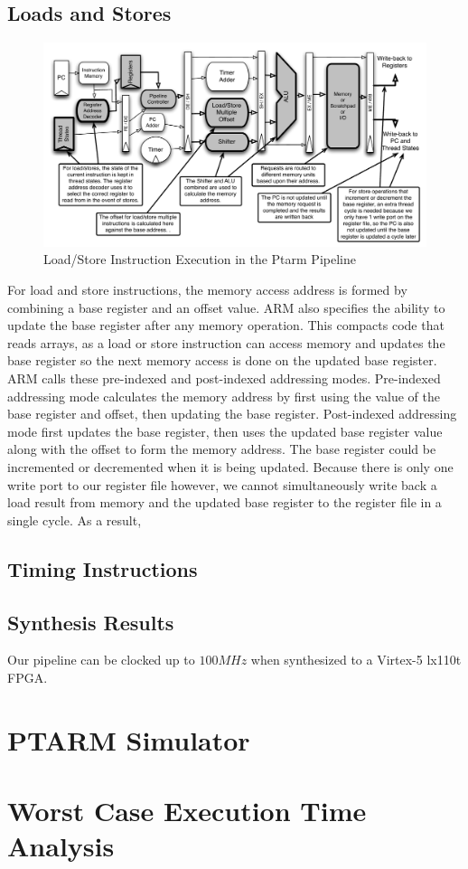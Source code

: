 \subsection{Loads and Stores}
\begin{figure}
  \vspace{-20pt}
  \begin{center}
    \includegraphics[scale=.6]{figs/ldstr_pipeline_implementation}
  \end{center}
  \vspace{-20pt}
  \caption{Load/Store Instruction Execution in the Ptarm Pipeline}
  \label{fig:ldstr_pipeline_implementation}
\end{figure}
For load and store instructions, the memory access address is formed by combining a base register and an offset value. 
ARM also specifies the ability to update the base register after any memory operation. 
This compacts code that reads arrays, as a load or store instruction can access memory and updates the base register so the next memory access is done on the updated base register.
ARM calls these pre-indexed and post-indexed addressing modes. 
Pre-indexed addressing mode calculates the memory address by first using the value of the base register and offset, then updating the base register. 
Post-indexed addressing mode first updates the base register, then uses the updated base register value along with the offset to form the memory address. 
The base register could be incremented or decremented when it is being updated.   
Because there is only one write port to our register file however, we cannot simultaneously write back a load result from memory and the updated base register to the register file in a single cycle. 
As a result, 

\subsection{Timing Instructions}

\subsection{Synthesis Results}
Our pipeline can be clocked up to $100MHz$ when synthesized to a Virtex-5 lx110t FPGA.  
\section{PTARM Simulator}
\label{sec:ptarm_sim}

\section{Worst Case Execution Time Analysis}
\label{sec:wcet}





